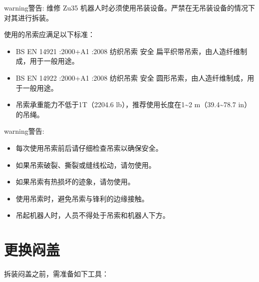 \documentclass[a4paper,11pt,english,openany,oneside]{sphinxmanual}
\begin{document}
\begin{sphinxadmonition}{warning}{警告:}
\sphinxAtStartPar
维修 Zu35 机器人时必须使用吊装设备。严禁在无吊装设备的情况下对其进行拆装。
\end{sphinxadmonition}

\sphinxAtStartPar
使用的吊索应满足以下标准：
\begin{itemize}
\item {} 
\sphinxAtStartPar
BS EN 1492\sphinxhyphen{}1 :2000+A1 :2008 纺织吊索 \sphinxhyphen{} 安全 \sphinxhyphen{} 扁平织带吊索，由人造纤维制成，用于一般用途。

\item {} 
\sphinxAtStartPar
BS EN 1492\sphinxhyphen{}2 :2000+A1 :2008 纺织吊索 \sphinxhyphen{} 安全 \sphinxhyphen{} 圆形吊索，由人造纤维制成，用于一般用途。

\item {} 
\sphinxAtStartPar
吊索承重能力不低于1T（2204.6 lb），推荐使用长度在1\textasciitilde{}2 m（39.4\textasciitilde{}78.7 in）的吊绳。

\end{itemize}

\begin{sphinxadmonition}{warning}{警告:}\begin{itemize}
\item {} 
\sphinxAtStartPar
每次使用吊索前后请仔细检查吊索以确保安全。

\item {} 
\sphinxAtStartPar
如果吊索破裂、撕裂或缝线松动，请勿使用。

\item {} 
\sphinxAtStartPar
如果吊索有热损坏的迹象，请勿使用。

\item {} 
\sphinxAtStartPar
使用吊索时，避免吊索与锋利的边缘接触。

\item {} 
\sphinxAtStartPar
吊起机器人时，人员不得处于吊索和机器人下方。

\end{itemize}
\end{sphinxadmonition}

\sphinxstepscope


\section{更换闷盖}
\label{\detokenize{_u66f4_u6362_u95f7_u76d6_uff0c_u73af_u5f62_u706f_u58f3:id1}}\label{\detokenize{_u66f4_u6362_u95f7_u76d6_uff0c_u73af_u5f62_u706f_u58f3:id2}}\label{\detokenize{_u66f4_u6362_u95f7_u76d6_uff0c_u73af_u5f62_u706f_u58f3::doc}}
\sphinxAtStartPar
拆装闷盖之前，需准备如下工具：
\end{document}
